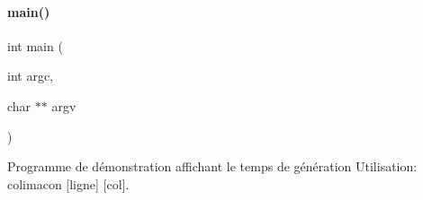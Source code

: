 \paragraph{\texorpdfstring{main()}{main()}}
{\footnotesize\ttfamily int main (\begin{DoxyParamCaption}\item[{int}]{argc,  }\item[{char $\ast$$\ast$}]{argv }\end{DoxyParamCaption})}



Programme de démonstration affichant le temps de génération Utilisation\+: colimacon \mbox{[}ligne\mbox{]} \mbox{[}col\mbox{]}. 

